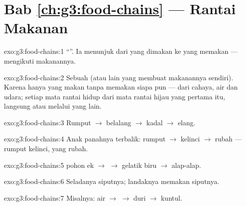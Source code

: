 \section*{Bab \ref{ch:g3:food-chains} --- Rantai Makanan}

\begin{solution}{exo:g3:food-chains:1}
``''. Ia menunjuk dari yang dimakan ke yang memakan ---
mengikuti makanannya.
\end{solution}

\begin{solution}{exo:g3:food-chains:2}
Sebuah  (atau  lain yang membuat makanannya
sendiri). Karena hanya  yang makan tanpa memakan siapa pun ---
dari cahaya, air dan udara; setiap mata rantai  hidup dari mata
rantai hijau yang pertama itu, langsung atau melalui yang lain.
\end{solution}

\begin{solution}{exo:g3:food-chains:3}
Rumput $\rightarrow$ belalang $\rightarrow$ kadal $\rightarrow$
elang.
\end{solution}

\begin{solution}{exo:g3:food-chains:4}
Anak panahnya terbalik: rumput $\rightarrow$ kelinci $\rightarrow$
rubah --- rumput  kelinci, yang  rubah.
\end{solution}

\begin{solution}{exo:g3:food-chains:5}
 pohon ek $\rightarrow$  $\rightarrow$  gelatik biru
$\rightarrow$ alap-alap.
\end{solution}

\begin{solution}{exo:g3:food-chains:6}
Seladanya  siputnya; landaknya memakan siputnya.
\end{solution}

\begin{solution}{exo:g3:food-chains:7}
Misalnya:  air $\rightarrow$  $\rightarrow$  duri
$\rightarrow$ kuntul.
\end{solution}

